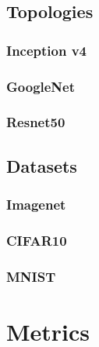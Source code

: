 \documentclass[titlepage]{report}
\begin{document}
\section{Topologies}
\lipsum[3]

\subsection{Inception v4}
\lipsum[3]

\subsection{GoogleNet}
\lipsum[3]

\subsection{Resnet50}
\lipsum[3]

\section{Datasets}
\lipsum[3]

\subsection{Imagenet}
\lipsum[3]

\subsection{CIFAR10}
\lipsum[3]

\subsection{MNIST}
\lipsum[3]




\chapter{Metrics}
\end{document}
